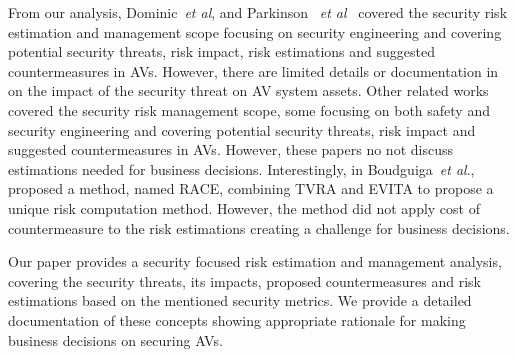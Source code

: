 \documentclass[runningheads]{llncs}
\begin{document}
From our analysis, Dominic~\textit{et al}, and Parkinson~\textit{ et al}~\cite{dominic2016risk,parkinson2017cyber} covered the security risk estimation and management scope focusing on security engineering and covering potential security threats, risk impact, risk estimations and suggested countermeasures in AVs. However, there are limited details or documentation in~\cite{dominic2016risk,parkinson2017cyber} on the impact of the security threat on AV system assets. %
Other related works~\cite{chattopadhyay2020autonomous,cui2019review,malik2020analysis,AffiaEtAl2019,dibaei2020attacks,de2020driverless,lima2016towards,kong2018security} covered the security risk management scope, some focusing on both safety and security engineering and covering potential security threats, risk impact and suggested countermeasures in AVs. However, these papers no not discuss estimations needed for business decisions.
%
%
%
Interestingly, in Boudguiga~\textit{et al}.,~\cite{boudguiga2015race} proposed a method, named RACE, combining TVRA and EVITA to propose a unique risk computation method. However, the method did not apply cost of countermeasure to the risk estimations creating a challenge for business decisions.
%

Our paper provides a security focused risk estimation and management analysis, covering the security threats, its impacts, proposed countermeasures and risk estimations based on the mentioned security metrics. We provide a detailed documentation of these concepts showing appropriate rationale for making business decisions on securing AVs.
\end{document}
